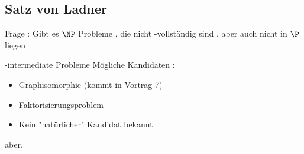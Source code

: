 \subsection[Satz von Ladner]{Satz von Ladner}

\begin{frame}
	Frage : Gibt es $\NP$  Probleme , die nicht \NP -vollständig sind , aber auch nicht in $\P$  liegen
\end{frame}
\begin{frame}{\NP -intermediate Probleme}
	Mögliche Kandidaten :
	\begin{itemize}
	\item Graphisomorphie (kommt in Vortrag 7)
	\item Faktorisierungsproblem
	\item Kein "natürlicher" Kandidat bekannt
	\end{itemize}
	
	aber,
\end{frame}

